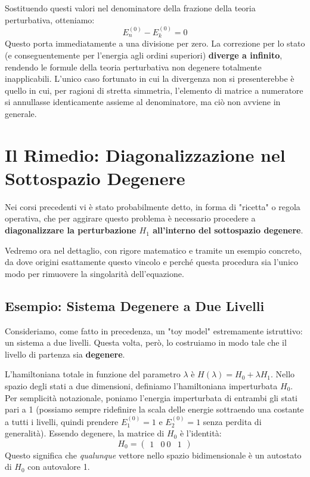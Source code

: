 Sostituendo questi valori nel denominatore della frazione della teoria perturbativa, otteniamo:
\begin{equation}
E_n^{(0)} - E_k^{(0)} = 0
\end{equation}
Questo porta immediatamente a una divisione per zero. La correzione per lo stato (e conseguentemente per l'energia agli ordini superiori) \textbf{diverge a infinito}, rendendo le formule della teoria perturbativa non degenere totalmente inapplicabili. L'unico caso fortunato in cui la divergenza non si presenterebbe è quello in cui, per ragioni di stretta simmetria, l'elemento di matrice a numeratore si annullasse identicamente assieme al denominatore, ma ciò non avviene in generale.

\section{Il Rimedio: Diagonalizzazione nel Sottospazio Degenere}

Nei corsi precedenti vi è stato probabilmente detto, in forma di "ricetta" o regola operativa, che per aggirare questo problema è necessario procedere a \textbf{diagonalizzare la perturbazione $H_1$ all'interno del sottospazio degenere}.

Vedremo ora nel dettaglio, con rigore matematico e tramite un esempio concreto, da dove origini esattamente questo vincolo e perché questa procedura sia l'unico modo per rimuovere la singolarità dell'equazione.

\subsection{Esempio: Sistema Degenere a Due Livelli}

Consideriamo, come fatto in precedenza, un "toy model" estremamente istruttivo: un sistema a due livelli. Questa volta, però, lo costruiamo in modo tale che il livello di partenza sia \textbf{degenere}.

L'hamiltoniana totale in funzione del parametro $\lambda$ è $H(\lambda) = H_0 + \lambda H_1$.
Nello spazio degli stati a due dimensioni, definiamo l'hamiltoniana imperturbata $H_0$. Per semplicità notazionale, poniamo l'energia imperturbata di entrambi gli stati pari a 1 (possiamo sempre ridefinire la scala delle energie sottraendo una costante a tutti i livelli, quindi prendere $E_1^{(0)} = 1$ e $E_2^{(0)} = 1$ senza perdita di generalità). Essendo degenere, la matrice di $H_0$ è l'identità:
\begin{equation}
H_0 = \begin{pmatrix} 1 & 0 \ 0 & 1 \end{pmatrix}
\end{equation}
Questo significa che \textit{qualunque} vettore nello spazio bidimensionale è un autostato di $H_0$ con autovalore 1.

